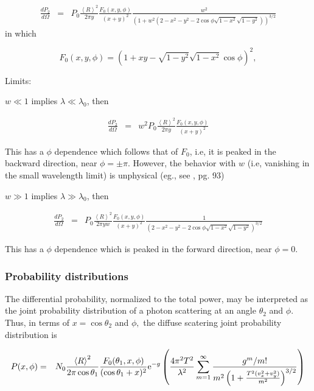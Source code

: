 \documentclass[11pt]{article}
\newcommand{\der}[2]{\frac{d {#1}}{d {#2}}}
\newcommand{\e}{{\rm e}}
\begin{document}
{{{{\begin{eqnarray}
\der{P_{2}}{\Omega}&=&
P_{0}\frac{\left<R\right>^{2}}{2\pi y}\frac{F_{0}(x,y,\phi)}{(x+y)^{2}}\frac{w^{2}}{\left(1+w^{2}\left(2-x^{2}-y^{2}-2\cos\phi\sqrt{1-x^{2}}\sqrt{1-y^{2}}\right)\right)^{3/2}}
\end{eqnarray}
in which

$$F_{0}(x,y,\phi)=\left(1+xy-\sqrt{1-y^{2}}\sqrt{1-x^{2}}\cos\phi\right)^{2},$$

Limits: 

$w\ll1$ implies $\lambda \ll \lambda_{0}$, then

\begin{eqnarray}
\der{P_{2}}{\Omega}&=&w^{2}
P_{0}\frac{\left<R\right>^{2}}{2\pi y}\frac{F_{0}(x,y,\phi)}{(x+y)^{2}}\end{eqnarray}

This has a $\phi$ dependence which follows that of $F_{0}$, i.e, it is peaked in the backward direction, near $\phi=\pm\pi$. However, the behavior with $w$ (i.e, vanishing in the small wavelength limit) is unphysical (eg., see \cite{b:ogilvy}, pg. 93)

$w\gg1$ implies $\lambda \gg \lambda_{0}$, then

\begin{eqnarray}
\der{P_{2}}{\Omega}&=&
P_{0}\frac{\left<R\right>^{2}}{2\pi y w}\frac{F_{0}(x,y,\phi)}{(x+y)^{2}}\frac{1}{\left(2-x^{2}-y^{2}-2\cos\phi\sqrt{1-x^{2}}\sqrt{1-y^{2}}\right)^{3/2}}\end{eqnarray}


This has a $\phi$ dependence which is peaked in the forward direction, near $\phi=0$.

\subsubsection{Probability distributions}

The differential probability, normalized to the total power, may be interpreted as the joint probability distribution of a photon scattering at an angle $\theta_{2}$ and $\phi$.  Thus, in terms of $x=\cos\theta_{2}$ and $\phi,$ the diffuse scatering joint probability distribution is

\begin{eqnarray}
P(x,\phi)&=&N_{0}\frac{\left<R\right>^{2}}{2\pi\cos\theta_{1}}\frac{F_{0}(\theta_{1},x,\phi)}{(\cos{\theta_{1}}+x)^{2}}
\e^{-g}\left(\frac{4\pi^{2}T^{2}}{\lambda^{2}}\sum_{m=1}^{\infty}\frac{g^{m}/m!}{m^{2}\left(1+\frac{T^{2}(v_{x}^{2}+v_{y}^{2})}{m^{2}}\right)^{3/2}}\right)\end{eqnarray}

}}}}
\end{document}
